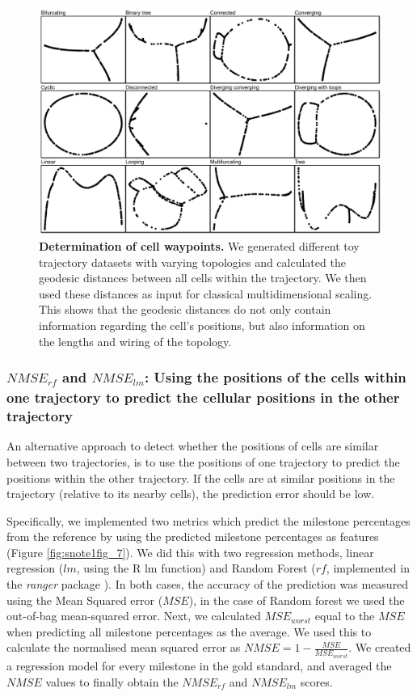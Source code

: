 \begin{figure}[tbh!]
	\centering\includegraphics[width=\linewidth]{fig/snote1fig_6.pdf}
	\caption{
		\textbf{Determination of cell waypoints.} 
		We generated different toy trajectory datasets with varying topologies and calculated the geodesic distances between all cells within the trajectory. We then used these distances as input for classical multidimensional scaling. This shows that the geodesic distances do not only contain information regarding the cell's positions, but also information on the lengths and wiring of the topology.
	}
	\label{fig:snote1fig_6}
\end{figure}

\subsubsection{$\textit{NMSE}_{\textit{rf}}$ and $\textit{NMSE}_{\textit{lm}}$: Using the positions of the cells within one trajectory to predict the cellular positions in the other trajectory}

An alternative approach to detect whether the positions of cells are similar between two trajectories, is to use the positions of one trajectory to predict the positions within the other trajectory. If the cells are at similar positions in the trajectory (relative to its nearby cells), the prediction error should be low.

Specifically, we implemented two metrics which predict the milestone percentages from the reference by using the predicted milestone percentages as features (Figure \ref{fig:snote1fig_7}). We did this with two regression methods, linear regression ($\textit{lm}$, using the R lm function) and Random Forest ($\textit{rf}$, implemented in the \textit{ranger} package  \cite{wright_rangerfastimplementation_2017}). In both cases, the accuracy of the prediction was measured using the Mean Squared error ($\mathit{MSE}$), in the case of Random forest we used the out-of-bag mean-squared error. Next, we calculated $\mathit{MSE}_{worst}$ equal to the $\mathit{MSE}$ when predicting all milestone percentages as the average. We used this to calculate the normalised mean squared error as $\mathit{NMSE} = 1 - \frac{\mathit{MSE}}{\mathit{MSE}_{worst}}$. We created a regression model for every milestone in the gold standard, and averaged the $\mathit{NMSE}$ values to finally obtain the $\textit{NMSE}_{\textit{rf}}$ and $\textit{NMSE}_{\textit{lm}}$ scores.

